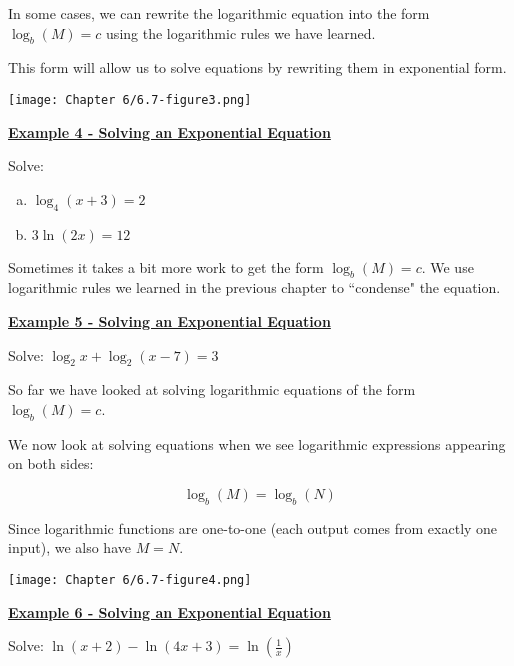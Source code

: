 \documentclass[12pt]{book}
\newcommand{\D}{\displaystyle}
\begin{document}
In some cases, we can rewrite the logarithmic equation into the form $\log_b(M)=c$ using the logarithmic rules we have learned. 

This form will allow us to solve equations by rewriting them in exponential form. 
\newpage

\centerline{\texttt{[image: Chapter 6/6.7-figure3.png]}}
\vspace{3mm}

\underline{\textbf{Example 4 - Solving an Exponential Equation}}
\vspace{1mm}

Solve:
\begin{multicols}{2}
    \begin{enumerate}[(a)]
    \item $\D \log_4(x+3)=2$
    \item $\D 3 \ln(2x)=12$
\end{enumerate}

\end{multicols}


\newpage
Sometimes it takes a bit more work to get the form $\log_b(M)=c$. We use logarithmic rules we learned in the previous chapter to ``condense" the equation. 

\vspace{1mm}

\underline{\textbf{Example 5 - Solving an Exponential Equation}}
\vspace{1mm}

Solve: $\D \log_2x+\log_2(x-7)=3$



\vspace{140mm}

So far we have looked at solving logarithmic equations of the form $\D \log_b(M)=c$. 

We now look at solving equations when we see logarithmic expressions appearing on both sides: 

$$\log_b(M)=\log_b(N)$$

Since logarithmic functions are one-to-one (each output comes from exactly one input), we also have $M=N$.

\newpage
\centerline{\texttt{[image: Chapter 6/6.7-figure4.png]}}
\vspace{3mm}

\underline{\textbf{Example 6 - Solving an Exponential Equation}}
\vspace{1mm}

Solve: $\D \ln(x+2) - \ln(4x+3)= \ln\left(\frac{1}{x}\right)$
\end{document}
